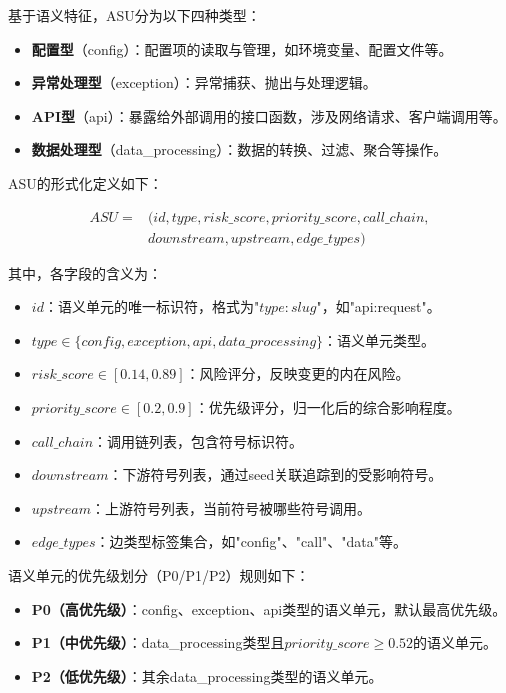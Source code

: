 基于语义特征，ASU分为以下四种类型：

\begin{itemize}
    \item \textbf{配置型}（config）：配置项的读取与管理，如环境变量、配置文件等。
    \item \textbf{异常处理型}（exception）：异常捕获、抛出与处理逻辑。
    \item \textbf{API型}（api）：暴露给外部调用的接口函数，涉及网络请求、客户端调用等。
    \item \textbf{数据处理型}（data\_processing）：数据的转换、过滤、聚合等操作。
\end{itemize}

ASU的形式化定义如下：

\[
\begin{aligned}
ASU = {}& (id, type, risk\_score, priority\_score, call\_chain, \\
& downstream, upstream, edge\_types)
\end{aligned}
\]

其中，各字段的含义为：
\begin{itemize}
    \item $id$：语义单元的唯一标识符，格式为"$type:slug$"，如"api:request"。
    \item $type \in \{config, exception, api, data\_processing\}$：语义单元类型。
    \item $risk\_score \in [0.14, 0.89]$：风险评分，反映变更的内在风险。
    \item $priority\_score \in [0.2, 0.9]$：优先级评分，归一化后的综合影响程度。
    \item $call\_chain$：调用链列表，包含符号标识符。
    \item $downstream$：下游符号列表，通过seed关联追踪到的受影响符号。
    \item $upstream$：上游符号列表，当前符号被哪些符号调用。
    \item $edge\_types$：边类型标签集合，如"config"、"call"、"data"等。
\end{itemize}

语义单元的优先级划分（P0/P1/P2）规则如下：
\begin{itemize}
    \item \textbf{P0（高优先级）}：config、exception、api类型的语义单元，默认最高优先级。
    \item \textbf{P1（中优先级）}：data\_processing类型且$priority\_score \geq 0.52$的语义单元。
    \item \textbf{P2（低优先级）}：其余data\_processing类型的语义单元。
\end{itemize}

